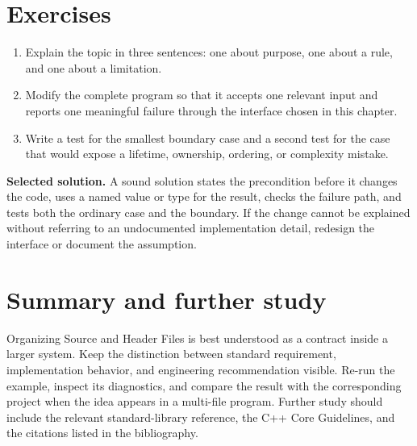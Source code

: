 \section{Exercises}
\begin{enumerate}
  \item Explain the topic in three sentences: one about purpose, one about a rule, and one about a limitation.
  \item Modify the complete program so that it accepts one relevant input and reports one meaningful failure through the interface chosen in this chapter.
  \item Write a test for the smallest boundary case and a second test for the case that would expose a lifetime, ownership, ordering, or complexity mistake.
\end{enumerate}

\textbf{Selected solution.} A sound solution states the precondition before it changes the code, uses a named value or type for the result, checks the failure path, and tests both the ordinary case and the boundary. If the change cannot be explained without referring to an undocumented implementation detail, redesign the interface or document the assumption.

\section{Summary and further study}
Organizing Source and Header Files is best understood as a contract inside a larger system. Keep the distinction between standard requirement, implementation behavior, and engineering recommendation visible. Re-run the example, inspect its diagnostics, and compare the result with the corresponding project when the idea appears in a multi-file program. Further study should include the relevant standard-library reference, the C++ Core Guidelines, and the citations listed in the bibliography.

